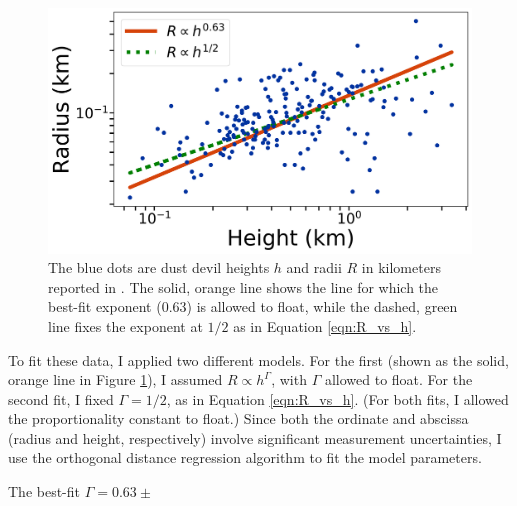 \documentclass{aastex63}
\begin{document}
\begin{figure}
    \centering
    \includegraphics[width=\textwidth]{Fit_to_Stanzel_data.png}
    \caption{The blue dots are dust devil heights $h$ and radii $R$ in kilometers reported in \citet{2008Icar..197...39S}. The solid, orange line shows the line for which the best-fit exponent (0.63) is allowed to float, while the dashed, green line fixes the exponent at $1/2$ as in Equation \ref{eqn:R_vs_h}.}
    \label{fig:Fit_to_Stanzel_data}
\end{figure}

To fit these data, I applied two different models. For the first (shown as the solid, orange line in Figure \ref{fig:Fit_to_Stanzel_data}), I assumed $R \propto h^\Gamma$, with $\Gamma$ allowed to float. For the second fit, I fixed $\Gamma = 1/2$, as in Equation \ref{eqn:R_vs_h}. (For both fits, I allowed the proportionality constant to float.) Since both the ordinate and abscissa (radius and height, respectively) involve significant measurement uncertainties, I use the orthogonal distance regression algorithm \citep{odrref, scipy} to fit the model parameters.

The best-fit $\Gamma = 0.63 \pm$





\end{document}
